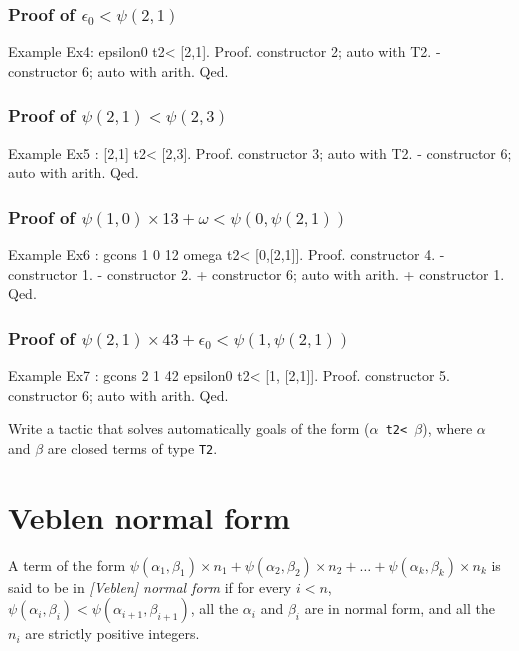 {\subsubsection*{Proof of $\epsilon_0<\psi(2,1)$}

\begin{Coqsrc}
Example Ex4: epsilon0 t2< [2,1].
Proof.
   constructor 2; auto with T2.
   - constructor 6; auto with arith.
Qed.
\end{Coqsrc}

\subsubsection*{Proof of $\psi(2,1)<\psi(2,3)$}

\begin{Coqsrc}
Example Ex5 : [2,1] t2< [2,3].
Proof.
  constructor 3; auto with T2.
  - constructor 6; auto with arith.
Qed.
\end{Coqsrc}

\subsubsection*{Proof of $\psi(1,0)\times 13+ \omega < \psi(0,\psi(2,1))$}
\label{sect:ex6-first-proof}

\begin{Coqsrc}
Example Ex6 : gcons 1 0 12 omega t2< [0,[2,1]].
Proof.
  constructor 4.
  - constructor 1.
  - constructor 2.
    + constructor 6; auto with arith.
    + constructor 1.
Qed.
\end{Coqsrc}

\subsubsection*{Proof of $\psi(2,1)\times 43 + \epsilon_0 < \psi(1,\psi(2,1))$}

\begin{Coqsrc}
Example Ex7 : gcons 2 1 42 epsilon0 t2< [1, [2,1]].
Proof.
 constructor 5.
 constructor 6; auto with arith.
Qed.
\end{Coqsrc}

\begin{project}
Write a tactic that solves automatically goals of the form (\texttt{$\alpha$ t2< $\beta$}), where $\alpha$ and $\beta$ are closed terms of type \texttt{T2}.
\end{project}

\section{Veblen normal form}
\begin{definition}
  A term of the form $\psi(\alpha_1,\beta_1)\times n_1+ \psi(\alpha_2,\beta_2)\times n_2+\dots+\psi(\alpha_k,\beta_k)\times n_k$ is said to be in
 \emph{[Veblen] normal form} if for every $i<n$, $\psi(\alpha_i,\beta_i)<\psi(\alpha_{i+1},\beta_{i+1})$, all the $\alpha_i$ and $\beta_i$ are in normal form, and all the $n_i$ are strictly positive integers.
\end{definition}

}
